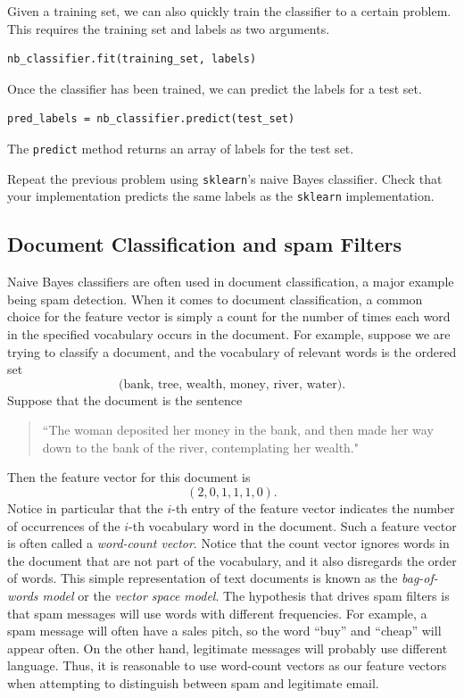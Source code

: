 Given a training set, we can also quickly train the classifier to a certain problem.
This requires the training set and labels as two arguments.

\begin{lstlisting}
nb_classifier.fit(training_set, labels)
\end{lstlisting}

Once the classifier has been trained, we can predict the labels for a test set.

\begin{lstlisting}
pred_labels = nb_classifier.predict(test_set)
\end{lstlisting}

The {\tt predict} method returns an array of labels for the test set.

\begin{problem}

Repeat the previous problem using {\tt sklearn}'s naive Bayes classifier.
Check that your implementation predicts the same labels as the {\tt sklearn}
implementation.

\end{problem}


\subsection*{Document Classification and spam Filters}

Naive Bayes classifiers are often used in document classification, a major example being spam detection.
When it comes to document classification, a common choice for the feature vector
is simply a count for the number of times each word in the specified vocabulary occurs in the document.
For example, suppose we are trying to classify a document, and the vocabulary of relevant words is the ordered set
\[
\text{(bank, tree, wealth, money, river, water)}.
\]
Suppose that the document is the sentence
\begin{quotation}
``The woman deposited her money in the bank, and then made her way down to the bank of the river, contemplating her wealth."
\end{quotation}
Then the feature vector for this document is
\[
(2, 0, 1, 1, 1, 0).
\]
Notice in particular that the $i$-th entry of the feature vector indicates the number of occurrences of the $i$-th
vocabulary word in the document.
Such a feature vector is often called a \emph{word-count vector}.
Notice that the count vector ignores words in the document that are not part of the vocabulary, and
it also disregards the order of words.
This simple representation of text documents is known as the \emph{bag-of-words model} or the \emph{vector space model}.
The hypothesis that drives spam filters is that spam messages will use words with different frequencies.
For example, a spam message will often have a sales pitch, so the word ``buy'' and ``cheap'' will appear often.
On the other hand, legitimate messages will probably use different language.
Thus, it is reasonable to use word-count vectors as our feature vectors when attempting to distinguish between spam and
legitimate email.

